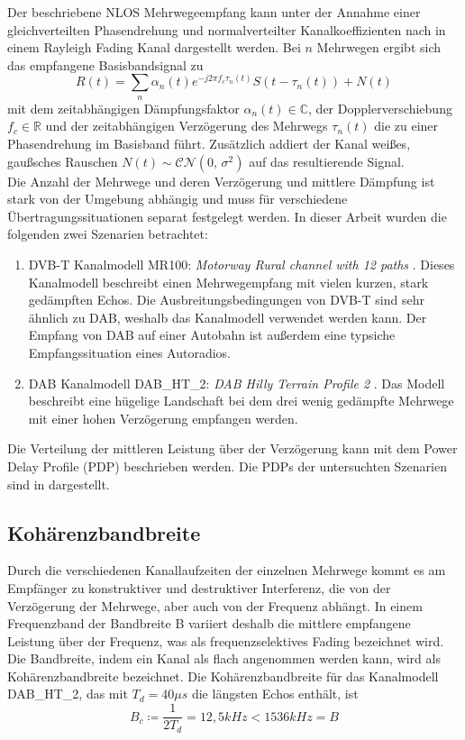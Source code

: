 Der beschriebene NLOS Mehrwegeempfang kann unter der Annahme einer gleichverteilten Phasendrehung und normalverteilter Kanalkoeffizienten nach \cite{proakis} in einem Rayleigh Fading Kanal dargestellt werden.
Bei $n$ Mehrwegen ergibt sich das empfangene Basisbandsignal zu
\begin{equation}
R(t) = \sum \limits_n \alpha_n(t) e^{-j2\pi f_c \tau_n(t)} S(t-\tau_n(t)) + N(t)
\end{equation}
mit dem zeitabhängigen Dämpfungsfaktor $\alpha_n(t) \in \mathbb{C}$, der Dopplerverschiebung $f_c \in \mathbb{R}$ und der zeitabhängigen Verzögerung des Mehrwegs $\tau_n(t)$ die zu einer Phasendrehung im Basisband führt. Zusätzlich addiert der Kanal weißes, gaußsches Rauschen $N(t) \sim \mathcal{C}\mathcal{N}(0,\,\sigma^{2})$ auf das resultierende Signal.\\  
Die Anzahl der Mehrwege und deren Verzögerung und mittlere Dämpfung ist stark von der Umgebung abhängig und muss für verschiedene Übertragungssituationen separat festgelegt werden.
In dieser Arbeit wurden die folgenden zwei Szenarien betrachtet:
\begin{enumerate}
\item DVB-T Kanalmodell MR100: \textit{Motorway Rural channel with 12 paths} \cite{kanalmodell:dvb_paper} \cite{etsi:dvb}. Dieses Kanalmodell beschreibt einen Mehrwegempfang mit vielen kurzen, stark gedämpften Echos. Die Ausbreitungsbedingungen von DVB-T sind sehr ähnlich zu DAB, weshalb das Kanalmodell verwendet werden kann. Der Empfang von DAB auf einer Autobahn ist außerdem eine typsiche Empfangssituation eines Autoradios.
\item DAB Kanalmodell DAB\_HT\_2: \textit{DAB Hilly Terrain Profile 2} \cite{kanalmodell:dab_ht_2}. Das Modell beschreibt eine hügelige Landschaft bei dem drei wenig gedämpfte Mehrwege mit einer hohen Verzögerung empfangen werden.
\end{enumerate}
Die Verteilung der mittleren Leistung über der Verzögerung kann mit dem Power Delay Profile (PDP) beschrieben werden. Die PDPs der untersuchten Szenarien sind in  dargestellt.

\subsection{Kohärenzbandbreite}
Durch die verschiedenen Kanallaufzeiten der einzelnen Mehrwege kommt es am Empfänger zu konstruktiver und destruktiver Interferenz, die von der Verzögerung der Mehrwege, aber auch von der Frequenz abhängt. In einem Frequenzband der Bandbreite B variiert deshalb die mittlere empfangene Leistung über der Frequenz, was als frequenzselektives Fading bezeichnet wird. Die Bandbreite, indem ein Kanal als flach angenommen werden kann, wird als Kohärenzbandbreite bezeichnet. Die Kohärenzbandbreite für das Kanalmodell DAB\_HT\_2, das mit $T_d = 40 \mu s$ die längsten Echos enthält, ist
\begin{equation}
B_c \coloneqq \frac{1}{2 T_d} = 12,5 kHz < 1536 kHz = B
\end{equation}


